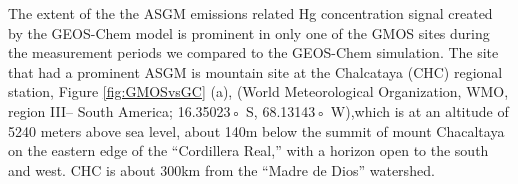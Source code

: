 \begin{table}[H]
\label{tab:modelvsobs metrics}

\centering
{}

\end{table}
\begin{flushleft}
 The extent of the  the ASGM emissions related Hg concentration signal created by the GEOS-Chem model is prominent in only one of the GMOS sites during the measurement periods we compared to the GEOS-Chem simulation. The site that had a prominent ASGM  is mountain site at the Chalcataya (CHC) regional station, Figure \ref{fig:GMOSvsGC} (a), (World Meteorological Organization, WMO, region III-- South America; 16.35023◦ S, 68.13143◦ W),which is at an altitude of 5240 meters above sea level, about 140m below the summit of mount Chacaltaya on the eastern edge of the ``Cordillera Real,'' with a horizon open to the south and west. CHC is about 300km from the ``Madre de Dios'' watershed.
\end{flushleft}





